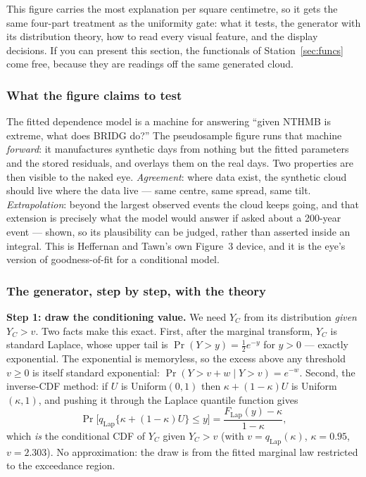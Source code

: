 \documentclass[11pt]{article}
\begin{document}
This figure carries the most explanation per square centimetre, so it gets
the same four-part treatment as the uniformity gate: what it tests, the
generator with its distribution theory, how to read every visual feature,
and the display decisions. If you can present this section, the functionals
of Station~\ref{sec:funcs} come free, because they are readings off the same
generated cloud.

\subsubsection{What the figure claims to test}

The fitted dependence model is a machine for answering ``given NTHMB is
extreme, what does BRIDG do?'' The pseudosample figure runs that machine
\emph{forward}: it manufactures synthetic days from nothing but the fitted
parameters and the stored residuals, and overlays them on the real days. Two
properties are then visible to the naked eye. \emph{Agreement}: where data
exist, the synthetic cloud should live where the data live --- same centre,
same spread, same tilt. \emph{Extrapolation}: beyond the largest observed
events the cloud keeps going, and that extension is precisely what the model
would answer if asked about a 200-year event --- shown, so its plausibility
can be judged, rather than asserted inside an integral. This is Heffernan and
Tawn's own Figure~3 device, and it is the eye's version of goodness-of-fit
for a conditional model.

\subsubsection{The generator, step by step, with the theory}

\textbf{Step 1: draw the conditioning value.} We need $Y_C$ from its
distribution \emph{given} $Y_C > v$. Two facts make this exact. First, after
the marginal transform, $Y_C$ is standard Laplace, whose upper tail is
$\Pr(Y > y) = \tfrac12 e^{-y}$ for $y > 0$ --- exactly exponential. The
exponential is memoryless, so the excess above any threshold $v \ge 0$ is
itself standard exponential: $\Pr(Y > v + w \mid Y > v) = e^{-w}$. Second,
the inverse-CDF method: if $U$ is Uniform$(0,1)$ then
$\kappa + (1-\kappa)U$ is Uniform$(\kappa, 1)$, and pushing it through the
Laplace quantile function gives
\[
\Pr\bigl[q_{\mathrm{Lap}}\{\kappa + (1-\kappa)U\} \le y\bigr]
= \frac{F_{\mathrm{Lap}}(y) - \kappa}{1-\kappa},
\]
which \emph{is} the conditional CDF of $Y_C$ given $Y_C > v$ (with
$v = q_{\mathrm{Lap}}(\kappa)$, $\kappa = 0.95$, $v = 2.303$). No
approximation: the draw is from the fitted marginal law restricted to the
exceedance region.
\end{document}
